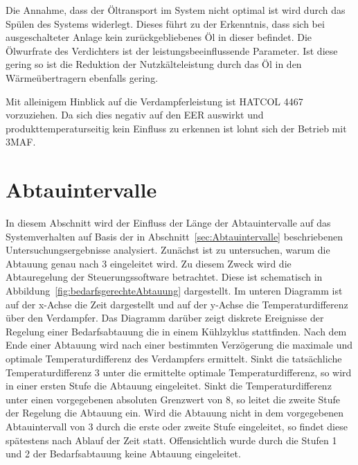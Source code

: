 Die Annahme, dass der Öltransport im System nicht optimal ist wird durch das Spülen des Systems widerlegt. Dieses führt zu der Erkenntnis, dass sich bei ausgeschalteter Anlage kein zurückgebliebenes Öl in dieser befindet. Die Ölwurfrate des Verdichters ist der leistungsbeeinflussende Parameter. Ist diese gering so ist die Reduktion der Nutzkälteleistung durch das Öl in den Wärmeübertragern ebenfalls gering. 

Mit alleinigem Hinblick auf die Verdampferleistung ist HATCOL 4467 vorzuziehen.
Da sich dies negativ auf den EER auswirkt und produkttemperaturseitig kein Einfluss zu erkennen ist lohnt sich der Betrieb mit 3MAF.










\clearpage




\section{Abtauintervalle}
\label{sec:AbtauintervalleAnalyse}

In diesem Abschnitt wird der Einfluss der Länge der Abtauintervalle auf das Systemverhalten auf Basis der in Abschnitt~\ref{sec:Abtauintervalle} beschriebenen Untersuchungsergebnisse analysiert. \newline
Zunächst ist zu untersuchen, warum die Abtauung genau nach \unit{3}{\hour} eingeleitet wird. Zu diesem Zweck wird die Abtauregelung der Steuerungssoftware betrachtet. Diese ist schematisch in Abbildung~\ref{fig:bedarfsgerechteAbtauung} dargestellt\cite{EmersonClimateTechnologies.2017}. Im unteren Diagramm ist auf der x-Achse die Zeit dargestellt und auf der y-Achse die Temperaturdifferenz über den Verdampfer. Das Diagramm darüber zeigt diskrete Ereignisse  der Regelung einer Bedarfsabtauung die in einem Kühlzyklus stattfinden.
Nach dem Ende einer Abtauung wird nach einer bestimmten Verzögerung die maximale und optimale Temperaturdifferenz des Verdampfers ermittelt. Sinkt die tatsächliche Temperaturdifferenz \unit{3}{\kelvin} unter die ermittelte optimale Temperaturdifferenz, so wird in einer ersten Stufe die Abtauung eingeleitet. Sinkt die Temperaturdifferenz unter einen vorgegebenen absoluten Grenzwert von \unit{8}{\kelvin}, so leitet die zweite Stufe der Regelung die Abtauung ein. Wird die Abtauung nicht in dem vorgegebenen Abtauintervall von \unit{3}{\hour} durch die erste oder zweite Stufe eingeleitet, so findet diese spätestens nach Ablauf der Zeit statt. Offensichtlich wurde durch die Stufen 1 und 2 der Bedarfsabtauung keine Abtauung eingeleitet. 

